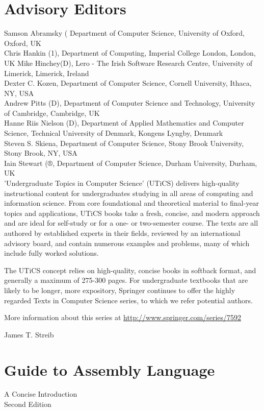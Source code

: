 \documentclass[10pt]{article}
\begin{document}
\section*{Advisory Editors}
Samson Abramsky ( Department of Computer Science, University of Oxford, Oxford, UK\\
Chris Hankin (1), Department of Computing, Imperial College London, London, UK Mike Hinchey(D), Lero - The Irish Software Research Centre, University of Limerick, Limerick, Ireland\\
Dexter C. Kozen, Department of Computer Science, Cornell University, Ithaca, NY, USA\\
Andrew Pitts (D), Department of Computer Science and Technology, University of Cambridge, Cambridge, UK\\
Hanne Riis Nielson (D), Department of Applied Mathematics and Computer Science, Technical University of Denmark, Kongens Lyngby, Denmark\\
Steven S. Skiena, Department of Computer Science, Stony Brook University, Stony Brook, NY, USA\\
Iain Stewart (®, Department of Computer Science, Durham University, Durham, UK\\
'Undergraduate Topics in Computer Science' (UTiCS) delivers high-quality instructional content for undergraduates studying in all areas of computing and information science. From core foundational and theoretical material to final-year topics and applications, UTiCS books take a fresh, concise, and modern approach and are ideal for self-study or for a one- or two-semester course. The texts are all authored by established experts in their fields, reviewed by an international advisory board, and contain numerous examples and problems, many of which include fully worked solutions.

The UTiCS concept relies on high-quality, concise books in softback format, and generally a maximum of 275-300 pages. For undergraduate textbooks that are likely to be longer, more expository, Springer continues to offer the highly regarded Texts in Computer Science series, to which we refer potential authors.

More information about this series at \href{http://www.springer.com/series/7592}{http://www.springer.com/series/7592}

James T. Streib

\section*{Guide to Assembly Language}
A Concise Introduction\\
Second Edition
\end{document}
